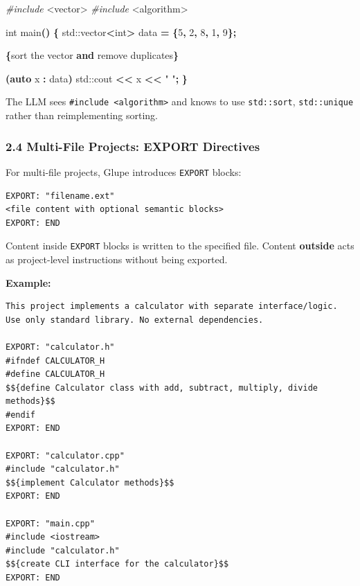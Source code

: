 \documentclass[11pt, a4paper]{article}
\newenvironment{Shaded}{\begin{snugshade}}{\end{snugshade}}
\newcommand{\BuiltInTok}[1]{#1}
\newcommand{\DataTypeTok}[1]{\textcolor[rgb]{0.13,0.29,0.53}{#1}}
\newcommand{\DecValTok}[1]{\textcolor[rgb]{0.00,0.00,0.81}{#1}}
\newcommand{\ErrorTok}[1]{\textcolor[rgb]{0.64,0.00,0.00}{\textbf{#1}}}
\newcommand{\ImportTok}[1]{#1}
\newcommand{\KeywordTok}[1]{\textcolor[rgb]{0.13,0.29,0.53}{\textbf{#1}}}
\newcommand{\NormalTok}[1]{#1}
\newcommand{\OperatorTok}[1]{\textcolor[rgb]{0.81,0.36,0.00}{\textbf{#1}}}
\newcommand{\PreprocessorTok}[1]{\textcolor[rgb]{0.56,0.35,0.01}{\textit{#1}}}
\newcommand{\StringTok}[1]{\textcolor[rgb]{0.31,0.60,0.02}{#1}}
\begin{document}
\begin{Shaded}
\begin{Highlighting}[]
\PreprocessorTok{\#include }\ImportTok{\textless{}vector\textgreater{}}
\PreprocessorTok{\#include }\ImportTok{\textless{}algorithm\textgreater{}}

\DataTypeTok{int}\NormalTok{ main}\OperatorTok{()} \OperatorTok{\{}
    \BuiltInTok{std::}\NormalTok{vector}\OperatorTok{\textless{}}\DataTypeTok{int}\OperatorTok{\textgreater{}}\NormalTok{ data }\OperatorTok{=} \OperatorTok{\{}\DecValTok{5}\OperatorTok{,} \DecValTok{2}\OperatorTok{,} \DecValTok{8}\OperatorTok{,} \DecValTok{1}\OperatorTok{,} \DecValTok{9}\OperatorTok{\};}
    
    \ErrorTok{$$}\OperatorTok{\{}\NormalTok{sort the vector }\KeywordTok{and}\NormalTok{ remove duplicates}\OperatorTok{\}}\ErrorTok{$$}
    
    \OperatorTok{(}\KeywordTok{auto}\NormalTok{ x }\OperatorTok{:}\NormalTok{ data}\OperatorTok{)} \BuiltInTok{std::}\NormalTok{cout }\OperatorTok{\textless{}\textless{}}\NormalTok{ x }\OperatorTok{\textless{}\textless{}} \StringTok{" "}\OperatorTok{;}
\OperatorTok{\}}
\end{Highlighting}
\end{Shaded}

The LLM sees \texttt{\#include\ \textless{}algorithm\textgreater{}} and
knows to use \texttt{std::sort}, \texttt{std::unique} rather than
reimplementing sorting.

\subsubsection{2.4 Multi-File Projects: EXPORT
Directives}\label{multi-file-projects-export-directives}

For multi-file projects, Glupe introduces \texttt{EXPORT} blocks:

\begin{verbatim}
EXPORT: "filename.ext"
<file content with optional semantic blocks>
EXPORT: END
\end{verbatim}

Content inside \texttt{EXPORT} blocks is written to the specified file.
Content \textbf{outside} acts as project-level instructions without
being exported.

\textbf{Example:}

\begin{verbatim}
This project implements a calculator with separate interface/logic.
Use only standard library. No external dependencies.

EXPORT: "calculator.h"
#ifndef CALCULATOR_H
#define CALCULATOR_H
$${define Calculator class with add, subtract, multiply, divide methods}$$
#endif
EXPORT: END

EXPORT: "calculator.cpp"
#include "calculator.h"
$${implement Calculator methods}$$
EXPORT: END

EXPORT: "main.cpp"
#include <iostream>
#include "calculator.h"
$${create CLI interface for the calculator}$$
EXPORT: END
\end{verbatim}
\end{document}
